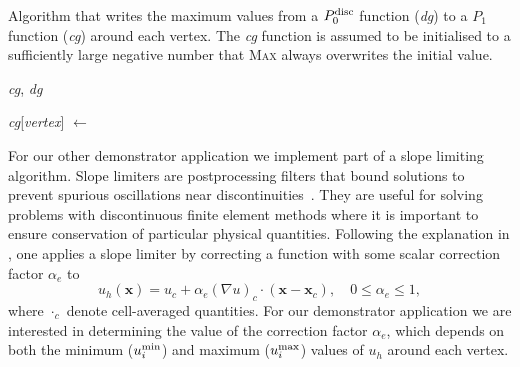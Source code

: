 \documentclass[thesis]{subfiles}
\begin{document}
\begin{algorithm}
  \caption{
    Algorithm that writes the maximum values from a $P_0^\textnormal{disc}$ function (\textit{dg}) to a $P_1$ function (\textit{cg}) around each vertex.
    The \textit{cg} function is assumed to be initialised to a sufficiently large negative number that \textsc{Max} always overwrites the initial value.
  }

  \begin{algorithmic}[1]
    \Require \textit{cg}, \textit{dg} 

       
        \State \textit{cg}[\textit{vertex}] $\gets$ 
      \EndFor
    \EndFor
  \end{algorithmic}
  \label{alg:slope_limiter}
\end{algorithm}

For our other demonstrator application we implement part of a slope limiting algorithm.
Slope limiters are postprocessing filters that bound solutions to prevent spurious oscillations near discontinuities~\cite{biswasParallelAdaptiveFinite1994}.
They are useful for solving problems with discontinuous finite element methods where it is important to ensure conservation of particular physical quantities.
Following the explanation in \cite{kuzminVertexbasedHierarchicalSlope2010}, one applies a slope limiter by correcting a function with some scalar correction factor $\alpha_e$ to
\begin{equation}
  u_h(\mathbf{x}) = u_c + \alpha_e(\nabla u)_c \cdot (\mathbf{x} - \mathbf{x}_c), \quad 0 \leq \alpha_e \leq 1 ,
\end{equation}
where $\cdot_c$ denote cell-averaged quantities.
For our demonstrator application we are interested in determining the value of the correction factor $\alpha_e$, which depends on both the minimum ($u_i^{\textnormal{min}}$) and maximum ($u_i^{\textnormal{max}}$) values of $u_h$ around each vertex.
\end{document}
